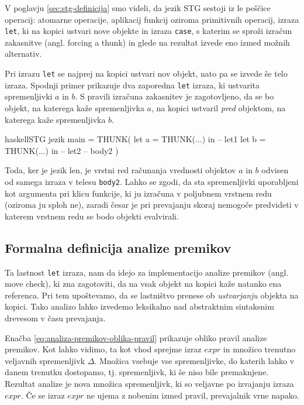 V poglavju \ref{sec:stg-definicija} smo videli, da jezik STG sestoji iz le peščice operacij: atomarne operacije, aplikacij funkcij oziroma primitivnih operacij, izraza \texttt{let}, ki na kopici ustvari nove objekte in izraza \texttt{case}, s katerim se sproži izračun zakasnitve (angl. forcing a thunk) in glede na rezultat izvede eno izmed možnih alternativ.

Pri izrazu \texttt{let} se najprej na kopici ustvari nov objekt, nato pa se izvede še telo izraza. Spodnji primer prikazuje dva zaporedna \texttt{let} izraza, ki ustvarita spremenljivki $a$ in $b$. S pravili izračuna zakasnitev je zagotovljeno, da se bo objekt, na katerega kaže spremenljivka $a$, na kopici ustvaril \emph{pred} objektom, na katerega kaže spremenljivka $b$.

\begin{code-box}{haskell}{STG jezik \cmark}
main = THUNK(
    let a = THUNK(...) in -- let1
    let b = THUNK(...) in -- let2
        -- body2
)
\end{code-box}

Toda, ker je jezik len, je vrstni red računanja vrednosti objektov $a$ in $b$ odvisen od samega izraza v telesu \texttt{body2}. Lahko se zgodi, da sta spremenljivki uporabljeni kot argumenta pri klicu funkcije, ki ju izračuna v poljubnem vrstnem redu (oziroma ju sploh ne), zaradi česar je pri prevajanju skoraj nemogoče predvideti v katerem vrstnem redu se bodo objekti evalvirali.

\subsection{Formalna definicija analize premikov}
Ta lastnost \texttt{let} izraza, nam da idejo za implementacijo analize premikov (angl. move check), ki zna zagotoviti, da na vsak objekt na kopici kaže natanko ena referenca. Pri tem upoštevamo, da se las\-tni\-štvo prenese ob \textit{ustvarjanju} objekta na kopici. Tako analizo lahko izvedemo leksikalno nad abstraktnim sintaksnim drevesom v času prevajanja.

Enačba \ref{eq:analiza-premikov-oblika-pravil} prikazuje obliko pravil analize premikov. Kot lahko vidimo, ta kot vhod sprejme izraz $expr$ in množico trenutno veljavnih spremenljivk $\Delta$. Množica vsebuje vse spremenljivke, do katerih lahko v danem trenutku dostopamo, tj. spremenljivk, ki še niso bile premaknjene. Rezultat analize je nova množica spremenljivk, ki so veljavne po izvajanju izraza $expr$. Če se izraz $expr$ ne ujema z nobenim izmed pravil, prevajalnik vrne napako.

